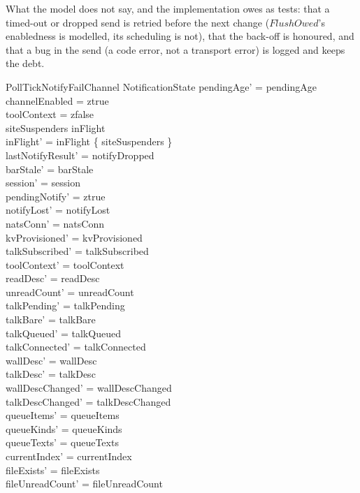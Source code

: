 \documentclass[a4paper,10pt,fleqn]{article}
\begin{document}
What the model does not say, and the implementation owes as tests: that a
timed-out or dropped send is retried before the next change ($FlushOwed$'s
enabledness is modelled, its scheduling is not), that the back-off is honoured,
and that a bug in the send (a code error, not a transport error) is logged and
keeps the debt.

\begin{schema}{PollTickNotifyFailChannel}
  \Delta NotificationState
  \where
  pendingAge' = pendingAge \\
  channelEnabled = ztrue \\
  toolContext = zfalse \\
  siteSuspenders \in inFlight \\
  inFlight' = inFlight \setminus \{ siteSuspenders \} \\
  lastNotifyResult' = notifyDropped \\
  barStale' = barStale \\
  session' = session \\
  pendingNotify' = ztrue \\
  notifyLost' = notifyLost \\
  natsConn' = natsConn \\
  kvProvisioned' = kvProvisioned \\
  talkSubscribed' = talkSubscribed \\
  toolContext' = toolContext \\
  readDesc' = readDesc \\
  unreadCount' = unreadCount \\
  talkPending' = talkPending \\
  talkBare' = talkBare \\
  talkQueued' = talkQueued \\
  talkConnected' = talkConnected \\
  wallDesc' = wallDesc \\
  talkDesc' = talkDesc \\
  wallDescChanged' = wallDescChanged \\
  talkDescChanged' = talkDescChanged \\
  queueItems' = queueItems \\
  queueKinds' = queueKinds \\
  queueTexts' = queueTexts \\
  currentIndex' = currentIndex \\
  fileExists' = fileExists \\
  fileUnreadCount' = fileUnreadCount \\

\end{schema}
\end{document}
